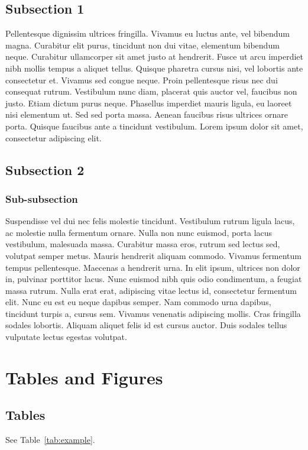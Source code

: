 \documentclass[jimisdraft]{jimis-en}
\begin{document}
\subsection{Subsection 1}
Pellentesque dignissim ultrices fringilla. Vivamus eu luctus ante, vel bibendum magna. Curabitur elit purus, tincidunt non dui vitae, elementum bibendum neque. Curabitur ullamcorper sit amet justo at hendrerit. Fusce ut arcu imperdiet nibh mollis tempus a aliquet tellus. Quisque pharetra cursus nisi, vel lobortis ante consectetur et. Vivamus sed congue neque. Proin pellentesque risus nec dui consequat rutrum. Vestibulum nunc diam, placerat quis auctor vel, faucibus non justo. Etiam dictum purus neque. Phasellus imperdiet mauris ligula, eu laoreet nisi elementum ut. Sed sed porta massa. Aenean faucibus risus ultrices ornare porta. Quisque faucibus ante a tincidunt vestibulum. Lorem ipsum dolor sit amet, consectetur adipiscing elit.


\subsection{Subsection 2}
\subsubsection{Sub-subsection}
Suspendisse vel dui nec felis molestie tincidunt. Vestibulum rutrum ligula lacus, ac molestie nulla fermentum ornare. Nulla non nunc euismod, porta lacus vestibulum, malesuada massa. Curabitur massa eros, rutrum sed lectus sed, volutpat semper metus. Mauris hendrerit aliquam commodo.  Vivamus fermentum tempus pellentesque. Maecenas a hendrerit urna. In elit ipsum, ultrices non dolor in, pulvinar porttitor lacus. Nunc euismod nibh quis odio condimentum, a feugiat massa rutrum. Nulla erat erat, adipiscing vitae lectus id, consectetur fermentum elit. Nunc eu est eu neque dapibus semper. Nam commodo urna dapibus, tincidunt turpis a, cursus sem. Vivamus venenatis adipiscing mollis. Cras fringilla sodales lobortis. Aliquam aliquet felis id est cursus auctor. Duis sodales tellus vulputate lectus egestas volutpat.





\section{Tables and Figures}
\subsection{Tables}
See Table~\ref{tab:example}.
\end{document}

